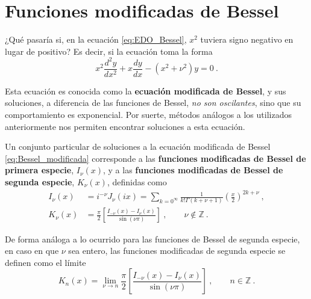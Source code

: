 \section{Funciones modificadas de Bessel}

¿Qué pasaría si, en la ecuación \eqref{eq:EDO_Bessel}, $x^2$ tuviera signo negativo en lugar de positivo? Es decir, si la ecuación toma la forma
\begin{equation}\label{eq:Bessel_modificada}
    x^2 \frac{d^2y}{dx^2} + x \frac{dy}{dx} - (x^2 + \nu^2)y = 0 \ . 
\end{equation}

Esta ecuación es conocida como la \textbf{ecuación modificada de Bessel}, y sus soluciones, a diferencia de las funciones de Bessel, \emph{no son oscilantes}, sino que su comportamiento es exponencial. Por suerte, métodos análogos a los utilizados anteriormente nos permiten encontrar soluciones a esta ecuación.

\begin{defi} 
    Un conjunto particular de soluciones a la ecuación modificada de Bessel \eqref{eq:Bessel_modificada} corresponde a las \textbf{funciones modificadas de Bessel de primera especie}, $I_\nu(x)$, y a las \textbf{funciones modificadas de Bessel de segunda especie}, $K_\nu(x)$, definidas como
    \begin{align}
        I_\nu(x) & = i^{-\nu} J_\nu(ix) = \sum_{k=0^\infty} \frac{1}{k! \Gamma(k+\nu+1)} \left( \frac{x}{2} \right)^{2k+\nu} \ , \\
        K_\nu(x) & = \frac{\pi}{2} \left[ \frac{I_{-\nu}(x) - I_\nu(x)}{\sin(\nu \pi)} \right] \ , \qquad \nu \notin \mathbb{Z} \ .
    \end{align}
\end{defi}

De forma análoga a lo ocurrido para las funciones de Bessel de segunda especie, en caso en que $\nu$ sea entero, las funciones modificadas de segunda especie se definen como el límite
\begin{equation}
    K_n(x) = \lim_{\nu \to n} \frac{\pi}{2} \left[ \frac{I_{-\nu}(x) - I_\nu(x)}{\sin(\nu \pi)} \right] \ , \qquad n \in \mathbb{Z} \ .
\end{equation}

